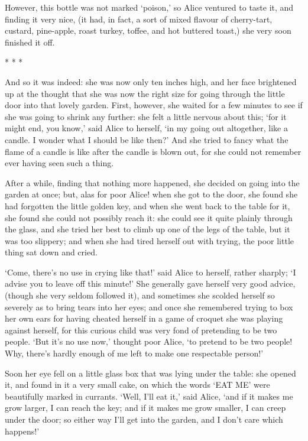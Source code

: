 \documentclass{article}
\begin{document}
However, this bottle was not marked `poison,' so Alice ventured to taste it, and finding it very nice, (it had, in fact, a sort of mixed flavour of cherry-tart, custard, pine-apple, roast turkey, toffee, and hot buttered toast,) she very soon finished it off.

\begin{center}
    * * *
\end{center}

And so it was indeed: she was now only ten inches high, and her face brightened up at the thought that she was now the right size for going through the little door into that lovely garden. First, however, she waited for a few minutes to see if she was going to shrink any further: she felt a little nervous about this; `for it might end, you know,' said Alice to herself, `in my going out altogether, like a candle. I wonder what I should be like then?' And she tried to fancy what the flame of a candle is like after the candle is blown out, for she could not remember ever having seen such a thing.

After a while, finding that nothing more happened, she decided on going into the garden at once; but, alas for poor Alice! when she got to the door, she found she had forgotten the little golden key, and when she went back to the table for it, she found she could not possibly reach it: she could see it quite plainly through the glass, and she tried her best to climb up one of the legs of the table, but it was too slippery; and when she had tired herself out with trying, the poor little thing sat down and cried.

`Come, there's no use in crying like that!' said Alice to herself, rather sharply; `I advise you to leave off this minute!' She generally gave herself very good advice, (though she very seldom followed it), and sometimes she scolded herself so severely as to bring tears into her eyes; and once she remembered trying to box her own ears for having cheated herself in a game of croquet she was playing against herself, for this curious child was very fond of pretending to be two people. `But it's no use now,' thought poor Alice, `to pretend to be two people! Why, there's hardly enough of me left to make one respectable person!'

Soon her eye fell on a little glass box that was lying under the table: she opened it, and found in it a very small cake, on which the words `EAT ME' were beautifully marked in currants. `Well, I'll eat it,' said Alice, `and if it makes me grow larger, I can reach the key; and if it makes me grow smaller, I can creep under the door; so either way I'll get into the garden, and I don't care which happens!'
\end{document}
